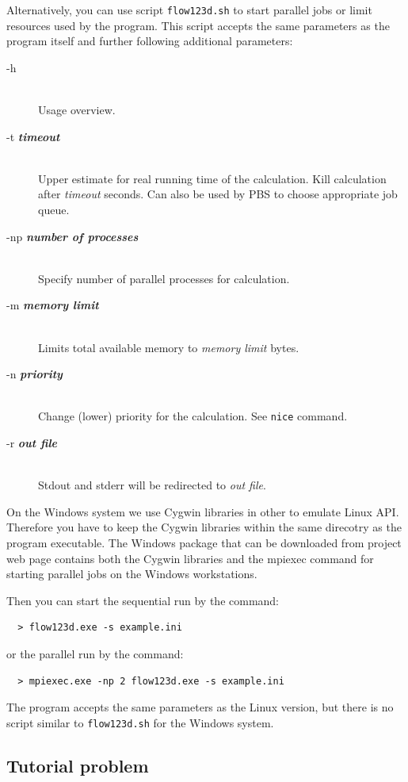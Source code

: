 \documentclass[12pt,a4paper]{report}
\begin{document}
Alternatively, you can use script \verb'flow123d.sh' to start parallel jobs or limit resources used by the program. 
This script accepts the same parameters as the program itself
and further following additional parameters:

\begin{description}
  \item[-h] \hfill\\
  	Usage overview.
  \item[-t {\bf\it timeout}] \hfill\\
  	Upper estimate for real running time of the calculation. Kill calculation after {\it timeout} seconds. 
  	Can also be used by PBS to choose appropriate job queue. 
  \item[-np {\bf\it number of processes}] \hfill\\
  	Specify number of parallel processes for calculation.
  \item[-m {\bf\it memory limit}] \hfill\\
  	Limits total available memory to {\it memory limit} bytes.
  \item[-n {\bf\it priority}] \hfill\\
  	Change (lower) priority for the calculation. See {\tt nice} command.
  \item[-r {\bf\it out file}] \hfill\\
  	Stdout and stderr will be redirected to {\it out file}.
\end{description}

On the Windows system we use Cygwin libraries in other to emulate Linux API.
Therefore you have to keep the Cygwin libraries within the same direcotry as the program executable.
The Windows package that can be downloaded from project web page contains both the Cygwin libraries
and the mpiexec command for starting parallel jobs on the Windows workstations.

Then you can start the sequential run by the command:
\begin{verbatim}
  > flow123d.exe -s example.ini
\end{verbatim}
or the parallel run by the command:
\begin{verbatim}
  > mpiexec.exe -np 2 flow123d.exe -s example.ini
\end{verbatim}
The program accepts the same parameters as the Linux version, but there is no script similar to \verb'flow123d.sh' for the Windows system.


\subsection{Tutorial problem}
\end{document}
